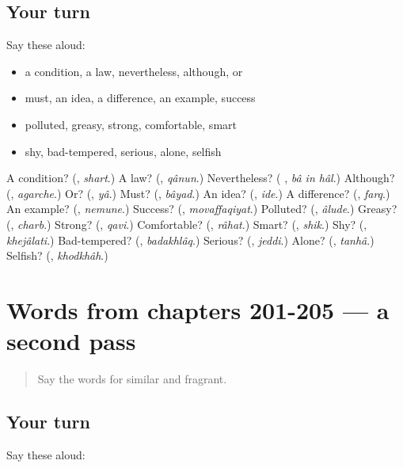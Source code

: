 \subsection*{Your turn}
Say these aloud:

\begin{itemize}
\raggedright
  \item a condition, a law, nevertheless, although, or
  \item must, an idea, a difference, an example, success
  \item polluted, greasy, strong, comfortable, smart
  \item shy, bad-tempered, serious, alone, selfish
\end{itemize}

\begin{tcolorbox}[breakable,colback=teal!4,colframe=teal!35!black,title={Before you move on}]
A condition? (\textbf{}, \emph{shart}.) A law? (\textbf{}, \emph{qânun}.) Nevertheless? (\textbf{  }, \emph{bâ in hâl}.) Although? (\textbf{}, \emph{agarche}.) Or? (\textbf{}, \emph{yâ}.) Must? (\textbf{}, \emph{bâyad}.) An idea? (\textbf{}, \emph{ide}.) A difference? (\textbf{}, \emph{farq}.) An example? (\textbf{}, \emph{nemune}.) Success? (\textbf{}, \emph{movaffaqiyat}.) Polluted? (\textbf{}, \emph{âlude}.) Greasy? (\textbf{}, \emph{charb}.) Strong? (\textbf{}, \emph{qavi}.) Comfortable? (\textbf{}, \emph{râhat}.) Smart? (\textbf{}, \emph{shik}.) Shy? (\textbf{}, \emph{khejâlati}.) Bad-tempered? (\textbf{}, \emph{badakhlâq}.) Serious? (\textbf{}, \emph{jeddi}.) Alone? (\textbf{}, \emph{tanhâ}.) Selfish? (\textbf{}, \emph{khodkhâh}.)
\end{tcolorbox}
\section[(dialogue)]{Words from chapters 201-205 — a second pass}

\label{lesson:FA-R205-second-pass-words-from-chapters-201-205}



\begin{quote}
Say the words for similar and fragrant.
\end{quote}

\subsection*{Your turn}
Say these aloud:

